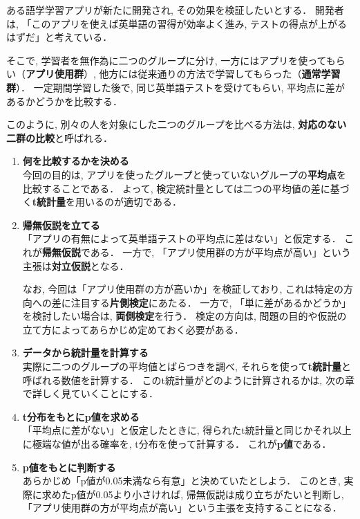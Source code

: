     ある語学学習アプリが新たに開発され, その効果を検証したいとする．
    開発者は, 「このアプリを使えば英単語の習得が効率よく進み, テストの得点が上がるはずだ」と考えている．
    
    そこで, 学習者を無作為に二つのグループに分け,
    一方にはアプリを使ってもらい（\textbf{アプリ使用群}）,
    他方には従来通りの方法で学習してもらった（\textbf{通常学習群}）．
    一定期間学習した後で, 同じ英単語テストを受けてもらい, 平均点に差があるかどうかを比較する．
    
    このように, 別々の人を対象にした二つのグループを比べる方法は,
    \textbf{対応のない二群の比較}と呼ばれる．
    
    \begin{enumerate}
      \item \textbf{何を比較するかを決める} \\
        今回の目的は, アプリを使ったグループと使っていないグループの\textbf{平均点}を比較することである．
        よって, 検定統計量としては二つの平均値の差に基づく\textbf{t統計量}を用いるのが適切である．
    
      \item \textbf{帰無仮説を立てる} \\
        「アプリの有無によって英単語テストの平均点に差はない」と仮定する．
        これが\textbf{帰無仮説}である．
        一方で, 「アプリ使用群の方が平均点が高い」という主張は\textbf{対立仮説}となる．
    
        なお, 今回は「アプリ使用群の方が高いか」を検証しており, 
        これは特定の方向への差に注目する\textbf{片側検定}にあたる．
        一方で, 「単に差があるかどうか」を検討したい場合は,
        \textbf{両側検定}を行う．
        検定の方向は, 問題の目的や仮説の立て方によってあらかじめ定めておく必要がある．
    
      \item \textbf{データから統計量を計算する} \\
        実際に二つのグループの平均値とばらつきを調べ,
        それらを使って\textbf{t統計量}と呼ばれる数値を計算する．  
        このt統計量がどのように計算されるかは, 次の章で詳しく見ていくことにする．
    
      \item \textbf{t分布をもとにp値を求める} \\
        「平均点に差がない」と仮定したときに,
        得られたt統計量と同じかそれ以上に極端な値が出る確率を,
        t分布を使って計算する．
        これが\textbf{p値}である．
    
      \item \textbf{p値をもとに判断する} \\
        あらかじめ「p値が0.05未満なら有意」と決めていたとしよう．
        このとき, 実際に求めたp値が0.05より小さければ,
        帰無仮説は成り立ちがたいと判断し,
        「アプリ使用群の方が平均点が高い」という主張を支持することになる．
    \end{enumerate}
    
